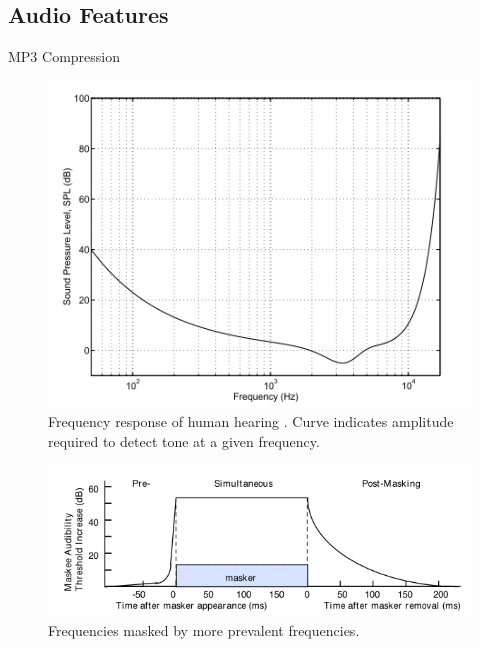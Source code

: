 \documentclass[notes]{beamer}
\begin{document}
\subsection{Audio Features}
\begin{frame}{MP3 Compression}
\begin{minipage}{0.45\textwidth}
	\centering
	\begin{figure}
		\centering
		\includegraphics[width=\textwidth]{"figures/Frequency Response from Perceptual Coding of Digital Audio NOCAPTION"}
		\caption{Frequency response of human hearing \cite{Painter2000}. Curve indicates amplitude required to detect tone at a given frequency.}
	\end{figure}
\end{minipage}\hfill
\begin{minipage}{0.45\textwidth}
	\begin{figure}
		\includegraphics[width=1.2\textwidth]{figures/masking}
		\caption{Frequencies masked by more prevalent frequencies\cite{Painter2000}.}
	\end{figure}
\end{minipage}\hfill
\end{frame}
\end{document}
